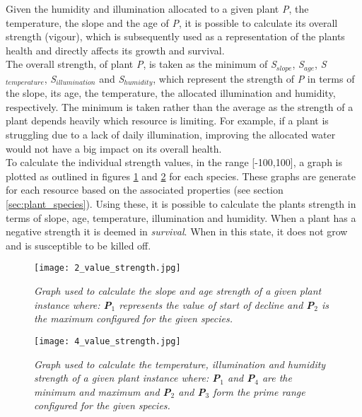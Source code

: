 Given the humidity and illumination allocated to a given plant \textit{P}, the temperature, the slope and the age of \textit{P}, it is possible to calculate its overall strength (vigour), which is subsequently used as a representation of the plants health and directly affects its growth and survival. \\
The overall strength, of plant \textit{P}, is taken as the minimum of \textit{S$_{slope}$}, \textit{S$_{age}$}, \textit{S$_{temperature}$}, \textit{S$_{illumination}$} and \textit{S$_{humidity}$}, which represent the strength of \textit{P} in terms of the slope, its age, the temperature, the allocated illumination and humidity, respectively. The minimum is taken rather than the average as the strength of a plant depends heavily which resource is limiting. For example, if a plant is struggling due to a lack of daily illumination, improving the allocated water would not have a big impact on its overall health.\\
To calculate the individual strength values, in the range [-100,100], a graph is plotted as outlined in figures \ref{fig:2_value_strength} and \ref{fig:4_value_strength} for each species. These graphs are generate for each resource based on the associated properties (see section \ref{sec:plant_species}). Using these, it is possible to calculate the plants strength in terms of slope, age, temperature, illumination and humidity. When a plant has a negative strength it is deemed in \textit{survival}. When in this state, it does not grow and is susceptible to be killed off.\\

\begin{figure}
\center
	\texttt{[image: 2\_value\_strength.jpg]}
	\caption{ \textit{Graph used to calculate the slope and age strength of a given plant instance where: \textbf{P$_{1}$} represents the value of \textit{start of decline} and \textbf{P$_{2}$} is the \textit{maximum} configured for the given species.} }	
	\label{fig:2_value_strength}
\end{figure}

\begin{figure}
\center
	\texttt{[image: 4\_value\_strength.jpg]}
	\caption{ \textit{Graph used to calculate the temperature, illumination and humidity strength of a given plant instance where: \textbf{P$_{1}$} and \textbf{P$_{4}$} are the \textit{minimum} and \textit{maximum} and \textbf{P$_{2}$} and \textbf{P$_{3}$} form the \textit{prime range} configured for the given species.}  }	
	\label{fig:4_value_strength}
\end{figure}

